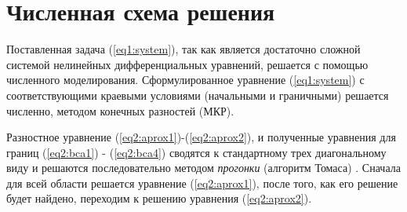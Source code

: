\chapter{Численная схема решения}
Поставленная задача (\ref{eq1:system}), так как является достаточно сложной системой нелинейных дифференциальных уравнений, решается с помощью численного моделирования. 
Сформулированное  уравнение  (\ref{eq1:system})  с  соответствующими краевыми  условиями  (начальными и  граничными)  решается численно, методом конечных разностей (МКР).



 





Разностное уравнение (\ref{eq2:aprox1})-(\ref{eq2:aprox2}), и полученные уравнения для границ (\ref{eq2:bca1}) - (\ref{eq2:bca4}) сводятся к стандартному трех диагональному виду и решаются последовательно методом \textit{прогонки} (алгоритм Томаса) \cite{kostomarov}. Сначала для всей области решается уравнение (\ref{eq2:aprox1}), после того, как его решение будет найдено, переходим к решению уравнения (\ref{eq2:aprox2}).



